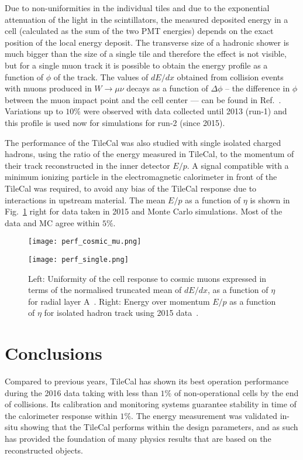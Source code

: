 \documentclass[10pt]{article}
\begin{document}
Due to non-uniformities in the individual tiles and due to the exponential attenuation of the light in the scintillators, the measured deposited energy in a cell (calculated as the sum of the two PMT energies) depends on the exact position of the local energy deposit. The transverse size of a hadronic shower is much bigger than the size of a single tile and therefore the effect is not visible, but for a single muon track it is possible to obtain the energy profile as a function of $\phi$ of the track. The values of $dE/dx$ obtained from collision events with muons produced in $W \rightarrow \mu \nu$ decays as a function of $\Delta \phi$ -- the difference in $\phi$ between the muon impact point and the cell center --- can be found in Ref.~\cite{Ushape}. Variations up to $10\%$ were observed with data collected until 2013 (run-1) and this profile is used now for simulations for run-2 (since 2015).

The performance of the TileCal was also studied with single isolated charged hadrons, using the ratio of the energy measured in TileCal, to  the momentum of their track reconstructed in the inner detector $E/p$. 
A signal compatible with a minimum ionizing particle in the electromagnetic calorimeter in front of the TileCal was required, to avoid any bias of the TileCal response due to interactions in upstream material.
The mean $E/p$ as a function of $\eta$ is shown in Fig.~\ref{fig:figure2} right for data taken in 2015 and Monte Carlo simulations.
Most of the data and MC agree within $5\%$.

\begin{figure}[t]
\center
\hspace{5mm}
\begin{minipage}[]{0.4\textwidth}
\texttt{[image: perf\_cosmic\_mu.png]}
\end{minipage}
\begin{minipage}[]{0.49\textwidth}
\texttt{[image: perf\_single.png]}
\end{minipage}
\caption{Left: Uniformity of the cell response to cosmic muons expressed in terms of the normalised truncated mean of $dE/dx$, as a function of $\eta$ for radial layer A~\cite{cosmicmu}. Right: Energy over momentum $E/p$ as a function of $\eta$ for isolated hadron track using 2015 data~\cite{singleparticle}.}
\label{fig:figure2}
\end{figure}

\section{Conclusions}
Compared to previous years, TileCal has shown its best operation performance during the 2016 data taking with less than $1\%$ of non-operational cells by the end of collisions. Its calibration and monitoring systems guarantee stability in time of the calorimeter response within $1\%$. The energy measurement was validated in-situ showing that the TileCal performs within the design parameters, and as such has provided the foundation of many physics results that are based on the reconstructed objects.
 
\end{document}
